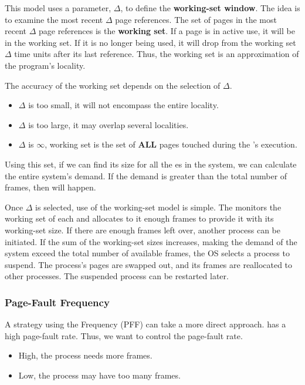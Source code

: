 This model uses a parameter, $\Delta$, to define the \textbf{working-set window}.
The idea is to examine the most recent $\Delta$ page references.
The set of pages in the most recent $\Delta$ page references is the \textbf{working set}.
If a page is in active use, it will be in the working set.
If it is no longer being used, it will drop from the working set $\Delta$ time units after its last reference.
Thus, the working set is an approximation of the program’s locality.

The accuracy of the working set depends on the selection of $\Delta$.
\begin{itemize}[noitemsep]
\item $\Delta$ is too small, it will not encompass the entire locality.
\item $\Delta$ is too large, it may overlap several localities.
\item $\Delta$ is $\infty$, working set is the set of \textbf{ALL} pages touched during the 's execution.
\end{itemize}

Using this set, if we can find its size for all the es in the system, we can calculate the entire system's demand.
If the demand is greater than the total number of frames, then  will happen.

Once $\Delta$ is selected, use of the working-set model is simple.
The  monitors the working set of each  and allocates to it enough frames to provide it with its working-set size.
If there are enough frames left over, another process can be initiated.
If the sum of the working-set sizes increases, making the demand of the system exceed the total number of available frames, the OS selects a process to suspend.
The process’s pages are swapped out, and its frames are reallocated to other processes.
The suspended process can be restarted later.

\subsubsection{Page-Fault Frequency}\label{subsubsec:Page_Fault_Frequency}
A strategy using the  Frequency (PFF) can take a more direct approach.
 has a high page-fault rate.
Thus, we want to control the page-fault rate.
\begin{itemize}[noitemsep]
\item High, the process needs more frames.
\item Low, the process may have too many frames.
\end{itemize}


